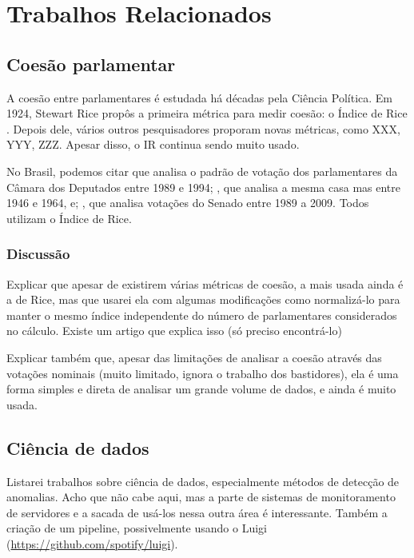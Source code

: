 \chapter{Trabalhos Relacionados}\label{cap:relacionados}


\section{Coesão parlamentar}

A coesão entre parlamentares é estudada há décadas pela Ciência Política. Em 1924, Stewart Rice propôs a primeira métrica para medir coesão: o Índice de Rice \cite{Rice1924}. Depois dele, vários outros pesquisadores proporam novas métricas, como XXX, YYY, ZZZ. Apesar disso, o IR continua sendo muito usado.

No Brasil, podemos citar  que analisa o padrão de
votação dos parlamentares da Câmara dos Deputados entre 1989 e 1994;
, que analisa a mesma casa mas entre 1946 e 1964, e;
, que analisa votações do Senado entre 1989 a 2009. Todos utilizam o Índice de Rice.

\subsection{Discussão}

Explicar que apesar de existirem várias métricas de coesão, a mais usada ainda é a de Rice, mas que usarei ela com algumas modificações como normalizá-lo para manter o mesmo índice independente do número de parlamentares considerados no cálculo. Existe um artigo que explica isso (só preciso encontrá-lo)

Explicar também que, apesar das limitações de analisar a coesão através das votações nominais (muito limitado, ignora o trabalho dos bastidores), ela é uma forma simples e direta de analisar um grande volume de dados, e ainda é muito usada.

\section{Ciência de dados}

Listarei trabalhos sobre ciência de dados, especialmente métodos de detecção de anomalias. Acho que não cabe aqui, mas a parte de sistemas de monitoramento de servidores e a sacada de usá-los nessa outra área é interessante. Também a criação de um pipeline, possivelmente usando o Luigi (\url{https://github.com/spotify/luigi}).


